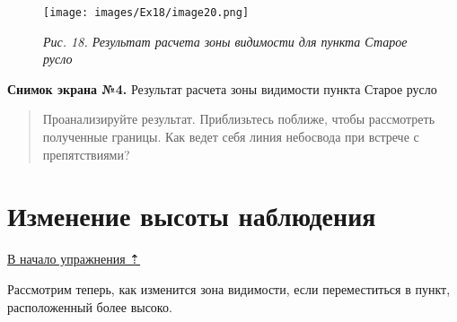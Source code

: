 \documentclass[12pt,]{book}
\begin{document}
\begin{enumerate}
  \begin{figure}
  \centering
  \texttt{[image: images/Ex18/image20.png]}
  \caption{\emph{Рис. 18. Результат расчета зоны видимости для пункта Старое русло}}
  \end{figure}

  \textbf{Снимок экрана №4.} Результат расчета зоны видимости пункта Старое русло
\end{enumerate}

\begin{quote}
Проанализируйте результат. Приблизьтесь поближе, чтобы рассмотреть полученные границы. Как ведет себя линия небосвода при встрече с препятствиями?
\end{quote}

\hypertarget{threed-modelling-height}{%
\section{Изменение высоты наблюдения}\label{threed-modelling-height}}

\protect\hyperlink{threed-modelling}{В начало упражнения ⇡}

Рассмотрим теперь, как изменится зона видимости, если переместиться в пункт, расположенный более высоко.
\end{document}
